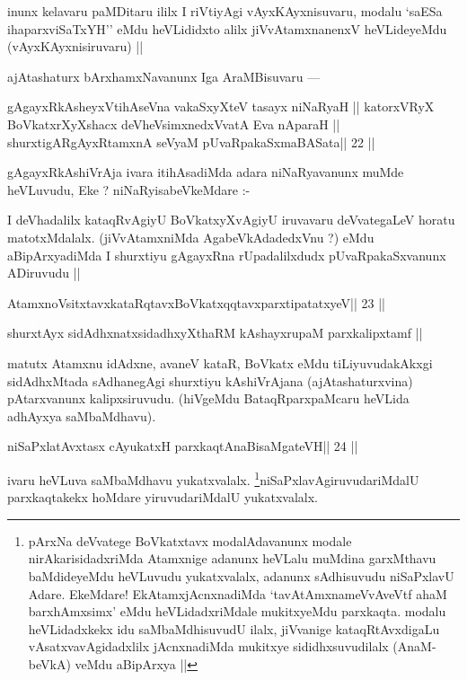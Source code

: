 \begin{artha}
inunx kelavaru paMDitaru ililx I riVtiyAgi vAyxKAyxnisuvaru, modalu `saESa ihaparxviSaTxYH'' eMdu heVLididxto alilx jiVvAtamxnanenxV heVLideyeMdu (vAyxKAyxnisiruvaru) ||
\end{artha}

\begin{artha}
ajAtashaturx bArxhamxNavanunx Iga AraMBisuvaru --- 
\end{artha}

\begin{shl}
gAgayxRkAsheyxVtihAseVna vakaSxyXteV tasayx niNaRyaH ||
katorxVRyX BoVkatxrXyXshacx deVheV\s simxnedxVvatA Eva nAparaH ||
shurxtigARgAyxRtamxnA seVyaM pUvaRpakaSxmaBASata\hfill || 22 ||
\end{shl}

\begin{artha}
gAgayxRkAshiVrAja ivara itihAsadiMda adara niNaRyavanunx muMde heVLuvudu, Eke ? niNaRyisabeVkeMdare :-
\end{artha} 
 
\begin{artha}
I deVhadalilx kataqRvAgiyU BoVkatxyXvAgiyU iruvavaru deVvategaLeV horatu matotxMdalalx. (jiVvAtamxniMda AgabeVkAdadedxVnu ?) eMdu aBipArxyadiMda I shurxtiyu gAgayxRna rUpadalilxdudx pUvaRpakaSxvanunx ADiruvudu ||
\end{artha}

\begin{shl}
AtamxnoV\s sitxtavxkataRqtavxBoVkatxqqtavxparxtipatatxyeV\hfill || 23 ||
\end{shl}

\begin{shl}
shurxtAyx sidAdhxnatxsidadhxyXthaRM kAshayxrupaM parxkalipxtamf ||
\end{shl}

\begin{artha}
matutx Atamxnu idAdxne, avaneV kataR, BoVkatx eMdu tiLiyuvudakAkxgi sidAdhxMtada sAdhanegAgi shurxtiyu kAshiVrAjana (ajAtashaturxvina) pAtarxvanunx kalipxsiruvudu. (hiVgeMdu BataqRparxpaMcaru heVLida adhAyxya saMbaMdhavu).
\end{artha} 
 

\begin{shl}
niSaPxlatAvxtasx cAyukatxH parxkaqtAnaBisaMgateVH\hfill || 24 ||
\end{shl}

\begin{artha}
ivaru heVLuva saMbaMdhavu yukatxvalalx. \footnote[1]{pArxNa deVvatege BoVkatxtavx modalAdavanunx modale nirAkarisidadxriMda Atamxnige adanunx heVLalu muMdina garxMthavu baMdideyeMdu heVLuvudu yukatxvalalx, adanunx sAdhisuvudu niSaPxlavU Adare. EkeMdare! EkAtamxjAcnxnadiMda `tavAtAmxnameVvAveVtf ahaM barxhAmxsimx' eMdu heVLidadxriMdale mukitxyeMdu parxkaqta. modalu heVLidadxkekx idu saMbaMdhisuvudU ilalx, jiVvanige kataqRtAvxdigaLu vAsatxvavAgidadxlilx jAcnxnadiMda mukitxye sididhxsuvudilalx (AnaM-beVkA) veMdu aBipArxya ||
}niSaPxlavAgiruvudariMdalU parxkaqtakekx hoMdare yiruvudariMdalU yukatxvalalx.
\end{artha}


